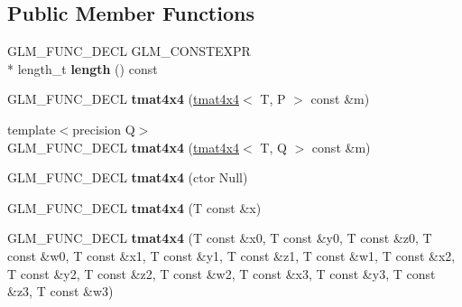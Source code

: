 \subsection*{Public Member Functions}
\begin{DoxyCompactItemize}
\item 
\hypertarget{structglm_1_1detail_1_1tmat4x4_af3a5d6805357ba6b87e100995fbbd338}{G\-L\-M\-\_\-\-F\-U\-N\-C\-\_\-\-D\-E\-C\-L G\-L\-M\-\_\-\-C\-O\-N\-S\-T\-E\-X\-P\-R \\*
length\-\_\-t {\bfseries length} () const }\label{structglm_1_1detail_1_1tmat4x4_af3a5d6805357ba6b87e100995fbbd338}

\item 
\hypertarget{structglm_1_1detail_1_1tmat4x4_a10821dfc2a11592b00c0504964af9a30}{G\-L\-M\-\_\-\-F\-U\-N\-C\-\_\-\-D\-E\-C\-L {\bfseries tmat4x4} (\hyperlink{structglm_1_1detail_1_1tmat4x4}{tmat4x4}$<$ T, P $>$ const \&m)}\label{structglm_1_1detail_1_1tmat4x4_a10821dfc2a11592b00c0504964af9a30}

\item 
\hypertarget{structglm_1_1detail_1_1tmat4x4_ad5f2b14d5f60c0b2b27ab28f7df8477b}{{\footnotesize template$<$precision Q$>$ }\\G\-L\-M\-\_\-\-F\-U\-N\-C\-\_\-\-D\-E\-C\-L {\bfseries tmat4x4} (\hyperlink{structglm_1_1detail_1_1tmat4x4}{tmat4x4}$<$ T, Q $>$ const \&m)}\label{structglm_1_1detail_1_1tmat4x4_ad5f2b14d5f60c0b2b27ab28f7df8477b}

\item 
\hypertarget{structglm_1_1detail_1_1tmat4x4_af4e9ff77d235161a72c835f8609dd8e7}{G\-L\-M\-\_\-\-F\-U\-N\-C\-\_\-\-D\-E\-C\-L {\bfseries tmat4x4} (ctor Null)}\label{structglm_1_1detail_1_1tmat4x4_af4e9ff77d235161a72c835f8609dd8e7}

\item 
\hypertarget{structglm_1_1detail_1_1tmat4x4_a265d71ebfc8a91f1b8d9104933799f49}{G\-L\-M\-\_\-\-F\-U\-N\-C\-\_\-\-D\-E\-C\-L {\bfseries tmat4x4} (T const \&x)}\label{structglm_1_1detail_1_1tmat4x4_a265d71ebfc8a91f1b8d9104933799f49}

\item 
\hypertarget{structglm_1_1detail_1_1tmat4x4_a4d793b3d9f54148c86334948d7eef97a}{G\-L\-M\-\_\-\-F\-U\-N\-C\-\_\-\-D\-E\-C\-L {\bfseries tmat4x4} (T const \&x0, T const \&y0, T const \&z0, T const \&w0, T const \&x1, T const \&y1, T const \&z1, T const \&w1, T const \&x2, T const \&y2, T const \&z2, T const \&w2, T const \&x3, T const \&y3, T const \&z3, T const \&w3)}\label{structglm_1_1detail_1_1tmat4x4_a4d793b3d9f54148c86334948d7eef97a}


\end{DoxyCompactItemize}
